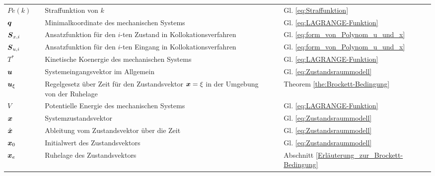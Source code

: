 \begin{small}
\begin{supertabular}{lcp{0.62\textwidth}cp{0.19\textwidth}}
		$Pe(k)$ && Straffunktion von $k$ && Gl. \ref{eq:Straffunktion}\\
		$\boldsymbol q$ && Minimalkoordinate des mechanischen Systems && Gl. \ref{eq:LAGRANGE-Funktion}\\
		$\boldsymbol S_{x,i}$ && Ansatzfunktion für den $i$-ten Zustand in Kollokationsverfahren && Gl. \ref{eq:form_von_Polynom_u_und_x}\\
		$\boldsymbol S_{u,i}$ && Ansatzfunktion für den $i$-ten Eingang in Kollokationsverfahren && Gl. \ref{eq:form_von_Polynom_u_und_x}\\
		$T^{\ast}$ && Kinetische Koenergie des mechanischen Systems && Gl. \ref{eq:LAGRANGE-Funktion}\\
		$\boldsymbol u$ && Systemeingangsvektor im Allgemein && Gl. \ref{eq:Zustandsraummodell}\\
		$\boldsymbol u_{\xi}$ && Regelgesetz über Zeit für den Zustandsvektor $\boldsymbol x=\xi$ in der Umgebung von der Ruhelage && Theorem \ref{the:Brockett-Bedingung}\\
		$V$ && Potentielle Energie des mechanischen Systems && Gl. \ref{eq:LAGRANGE-Funktion}\\
		$\boldsymbol x$ && Systemzustandsvektor  && Gl. \ref{eq:Zustandsraummodell}\\
		$\dot{\boldsymbol x}$ && Ableitung vom Zustandsvektor über die Zeit && Gl. \ref{eq:Zustandsraummodell}\\
		$\boldsymbol x_{0}$ && Initialwert des Zustandsvektors && Gl. \ref{eq:Zustandsraummodell}\\
		$\boldsymbol x_{e}$ && Ruhelage des Zustandsvektors && Abschnitt \ref{Erläuterung_zur_Brockett-Bedingung}\\

\end{supertabular}
\end{small}
